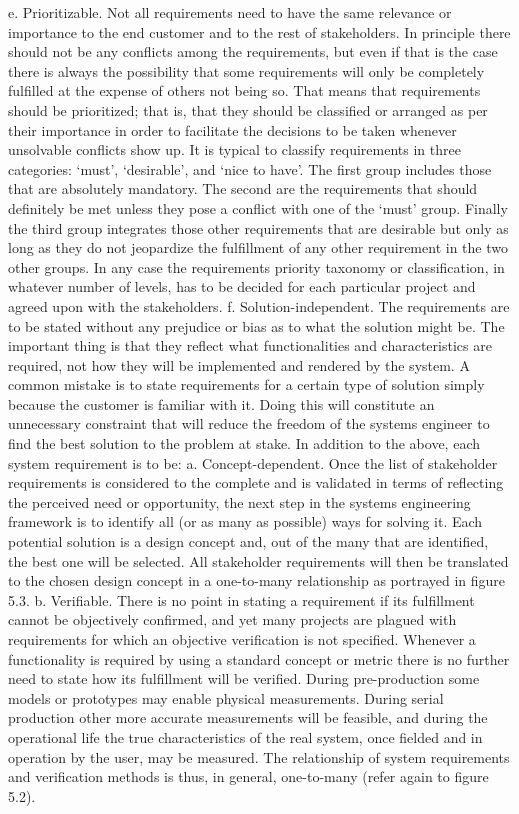     e. Prioritizable. Not all requirements need to have the same relevance or importance to the end customer and to the rest of stakeholders. In principle there should not be any conflicts among the requirements, but even if that is the case there is always the possibility that some requirements will only be completely fulfilled at the expense of others not being so. That means that requirements should be prioritized; that is, that they should be classified or arranged as per their importance in order to facilitate the decisions to be taken whenever unsolvable conflicts show up. It is typical to classify requirements in three categories: ‘must’, ‘desirable’, and ‘nice to have’. The first group includes those that are absolutely mandatory. The second are the requirements that should definitely be met unless they pose a conflict with one of the ‘must’ group. Finally the third group integrates those other requirements that are desirable but only as long as they do not jeopardize the fulfillment of any other requirement in the two other groups. In any case the requirements priority taxonomy or classification, in whatever number of levels, has to be decided for each particular project and agreed upon with the stakeholders.
    f. Solution-independent. The requirements are to be stated without any prejudice or bias as to what the solution might be. The important thing is that they reflect what functionalities and characteristics are required, not how they will be implemented and rendered by the system. A common mistake is to state requirements for a certain type of solution simply because the customer is familiar with it. Doing this will constitute an unnecessary constraint that will reduce the freedom of the systems engineer to find the best solution to the problem at stake.
In addition to the above, each system requirement is to be:
    a. Concept-dependent. Once the list of stakeholder requirements is considered to the complete and is validated in terms of reflecting the perceived need or opportunity, the next step in the systems engineering framework is to identify all (or as many as possible) ways for solving it. Each potential solution is a design concept and, out of the many that are identified, the best one will be selected. All stakeholder requirements will then be translated to the chosen design concept in a one-to-many relationship as portrayed in figure 5.3.
    b. Verifiable. There is no point in stating a requirement if its fulfillment cannot be objectively confirmed, and yet many projects are plagued with requirements for which an objective verification is not specified. Whenever a functionality is required by using a standard concept or metric there is no further need to state how its fulfillment will be verified. During pre-production some models or prototypes may enable physical measurements. During serial production other more accurate measurements will be feasible, and during the operational life the true characteristics of the real system, once fielded and in operation by the user, may be measured. The relationship of system requirements and verification methods is thus, in general, one-to-many (refer again to figure 5.2).
